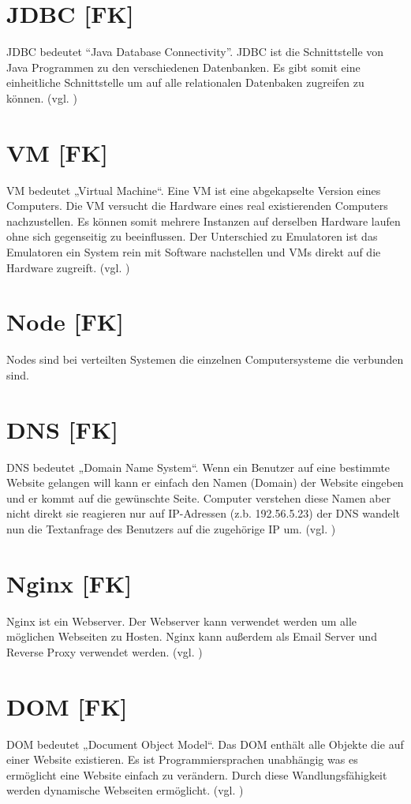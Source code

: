 \section{JDBC [FK]}\label{sec:JDBC}
JDBC bedeutet “Java Database Connectivity”. JDBC ist die Schnittstelle von Java Programmen zu den verschiedenen Datenbanken. Es gibt somit eine einheitliche Schnittstelle um auf alle relationalen Datenbaken zugreifen zu können. (vgl. \cite{JDBC})
\section{VM [FK]}\label{sec:VM}
VM bedeutet „Virtual Machine“. Eine VM ist eine abgekapselte Version eines Computers. Die VM versucht die Hardware eines real existierenden Computers nachzustellen. Es können somit mehrere Instanzen auf derselben Hardware laufen ohne sich gegenseitig zu beeinflussen. Der Unterschied zu Emulatoren ist das Emulatoren ein System rein mit Software nachstellen und VMs direkt auf die Hardware zugreift. (vgl. \cite{VM})
\section{Node [FK]}\label{sec:Node}
Nodes sind bei verteilten Systemen die einzelnen Computersysteme die verbunden sind. 
\section{DNS [FK]}\label{sec:DNS}
DNS bedeutet „Domain Name System“. Wenn ein Benutzer auf eine bestimmte Website gelangen will kann er einfach den Namen (Domain) der Website eingeben und er kommt auf die gewünschte Seite. Computer verstehen diese Namen aber nicht direkt sie reagieren nur auf IP-Adressen (z.b. 192.56.5.23) der DNS wandelt nun die Textanfrage des Benutzers auf die zugehörige IP um. (vgl. \cite{DNS})
\section{Nginx [FK]}\label{sec:nginx}
Nginx ist ein Webserver. Der Webserver kann verwendet werden um alle möglichen Webseiten zu Hosten. Nginx kann außerdem als Email Server und Reverse Proxy verwendet werden. (vgl. \cite{Nginx})
\section{DOM [FK]}\label{sec:dom}
DOM bedeutet „Document Object Model“. Das DOM enthält alle Objekte die auf einer Website existieren. Es ist Programmiersprachen unabhängig was es ermöglicht eine Website einfach zu verändern. Durch diese Wandlungsfähigkeit werden dynamische Webseiten ermöglicht. (vgl. \cite{DOM})